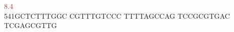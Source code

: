 \documentclass[11pt,twoside,reqno,a4paper]{article}
\begin{document}
{\hspace*{4\charwidth}\hspace*{1\charwidth}\hspace*{1\charwidth}\hspace*{23\charwidth}\textcolor{Brown}{8.4}\hspace*{1\charwidth}\hspace*{1\charwidth}\hspace*{1\charwidth}\hspace*{1\charwidth}\\
541\hspace*{1\charwidth}GCTCTTTGGC	CGTTTGTCCC	TTTTAGCCAG	TCCGCGTGAC	TCGAGCGTTG	\\
\hspace*{4\charwidth}\hspace*{1\charwidth}\hspace*{1\charwidth}\hspace*{1\charwidth}\hspace*{1\charwidth}\hspace*{1\charwidth}\\
}
\\
\end{document}
